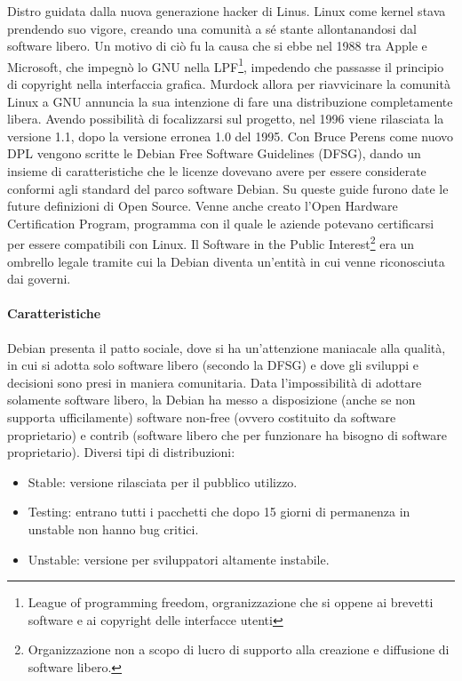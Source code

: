 Distro guidata dalla nuova generazione hacker di Linus. Linux come kernel stava prendendo suo vigore, creando una comunit\`a a sé stante allontanandosi dal software libero. Un motivo di ci\`o fu la causa che si ebbe nel 1988 tra Apple e Microsoft, che impegn\`o lo GNU nella LPF\footnote{League of programming freedom, orgranizzazione che si oppene ai brevetti software e ai copyright delle interfacce utenti}, impedendo che passasse il principio di copyright nella interfaccia grafica. Murdock allora per riavvicinare la comunit\`a Linux a GNU annuncia la sua intenzione di fare una distribuzione completamente libera. Avendo possibilit\`a di focalizzarsi sul progetto, nel 1996 viene rilasciata la versione 1.1, dopo la versione erronea 1.0 del 1995. Con Bruce Perens come nuovo DPL vengono scritte le Debian Free Software Guidelines (DFSG), dando un insieme di caratteristiche che le licenze dovevano avere per essere considerate conformi agli standard del parco software Debian. Su queste guide furono date le future definizioni di Open Source. Venne anche creato l'Open Hardware Certification Program, programma con il quale le aziende potevano certificarsi per essere compatibili con Linux. Il Software in the Public Interest\footnote{Organizzazione non a scopo di lucro di supporto alla creazione e diffusione di software libero.} era un ombrello legale tramite cui la Debian diventa un'entit\`a in cui venne riconosciuta dai governi.

\paragraph*{Caratteristiche} Debian presenta il patto sociale, dove si ha un'attenzione maniacale alla qualit\`a, in cui si adotta solo software libero (secondo la DFSG) e dove gli sviluppi e decisioni sono presi in maniera comunitaria. Data l'impossibilit\`a di adottare solamente software libero, la Debian ha messo a disposizione (anche se non supporta ufficilamente) software non-free (ovvero costituito da software proprietario) e contrib (software libero che per funzionare ha bisogno di software proprietario). Diversi tipi di distribuzioni:
\begin{itemize}
  
\item Stable: versione rilasciata per il pubblico utilizzo.
\item Testing: entrano tutti i pacchetti che dopo 15 giorni di permanenza in unstable non hanno bug critici.
\item Unstable: versione per sviluppatori altamente instabile.

\end{itemize}

